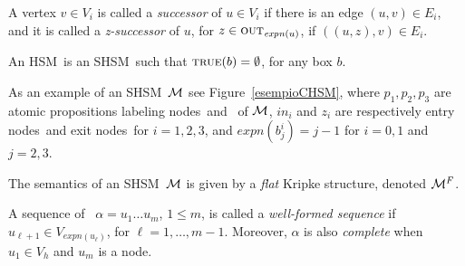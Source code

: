\documentclass[letterpaper,twocolumn,10pt]{article}
\newtheorem{definition}{Definition}
\newcommand{\ignore}[1]{}
\def    \M          {{\cal M}}
\newcommand{\VHSM}{SHSM}
\newcommand{\HSM}{HSM}
\newcommand{\nnode}{node} \newcommand{\nnodes}{nodes} \newcommand{\expand} {\mathit{expn}}
\newcommand{\OUT} {\mbox{\sc out}}
\newcommand{\prop}{\mbox{{\sc true}}}
\newcommand{\iin}{in}
\newcommand{\word}{well-formed sequence}
\begin{document}
A vertex $v\in V_i$ is called a \emph{successor} of $u\in V_i$ if there is an edge
 $(u, v)\in E_i$, and it is called a \emph{z-successor} of $u$,
 for $z \in \OUT_{\expand(u)}$,  if $((u,z),v)\in E_i $.

An \HSM\ is an \VHSM\ such that  $\prop(b)= \emptyset$,
for any box $b$.


As an example of an \VHSM\ $\M$ see
Figure~\ref{esempioCHSM}, where $p_1, p_2, p_3$ are atomic
propositions labeling \nnodes\ and \boxes\ of $\M$, $\iin_i$ and $z_i$
are respectively entry \nnodes\ and exit \nnodes\ for $i=1,2,3$, and
$\expand(b^i_j)=j-1$ for $i=0,1$ and $j=2,3$.




\ignore{
\begin{definition}\label{restricted}
A restricted \VHSM\ ${\cal M}$ is an \VHSM\
where for all vertices $u,v$
such that $u$ is an ancestor of $v$ in $\M$ it holds:\\
\centerline{$\prop(u) \cap \prop(v)
= \emptyset .$}
\end{definition}

Such a restriction is quite natural and still allows us to succinctly represent
interesting systems. Note that
the \VHSM\ of Figure~\ref{esempioCHSM} is also restricted.
}



The semantics of an \VHSM\ $\M$
is given by a {\em flat}  Kripke structure, denoted $\M^F$.

A sequence of \vertices\ $\alpha=u_1 \ldots u_m$, $1 \leq m$, is
called a {\em \word} if $u_{\ell+1} \in V_{\expand(u_\ell)}$, for
$\ell =1,\ldots,m-1$.
Moreover, $\alpha$ is also {\em complete} when $u_1 \in V_h$ and
$u_m$ is a \nnode.
\end{document}

